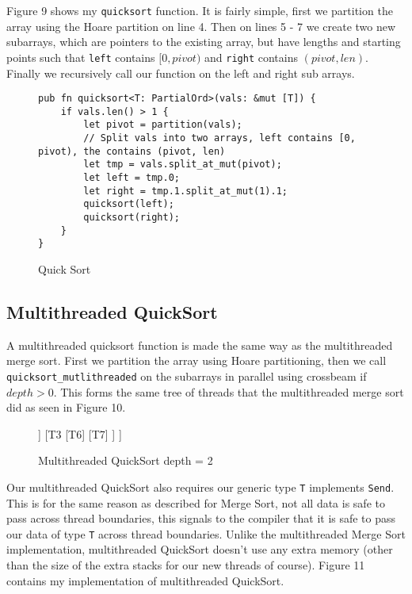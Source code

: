 \documentclass[12pt,letterpaper]{report}
\newcommand{\rust}[1]{\texttt{#1}}
\begin{document}
	Figure 9 shows my \rust{quicksort} function. It is fairly simple, first we partition the array using the Hoare partition on line 4. Then on lines 5 - 7 we create two new subarrays, which are pointers to the existing array, but have lengths and starting points such that \rust{left} contains $[0, pivot)$ and \rust{right} contains $(pivot, len)$. Finally we recursively call our function on the left and right sub arrays.

	\begin{figure}[H]
    \begin{verbatim}
pub fn quicksort<T: PartialOrd>(vals: &mut [T]) {
    if vals.len() > 1 {
        let pivot = partition(vals);
        // Split vals into two arrays, left contains [0, pivot), the contains (pivot, len)
        let tmp = vals.split_at_mut(pivot);
        let left = tmp.0;
        let right = tmp.1.split_at_mut(1).1;
        quicksort(left);
        quicksort(right);
    }
}
    \end{verbatim}
    \caption{Quick Sort}
\end{figure}
	
	\subsection*{Multithreaded QuickSort}
	
	A multithreaded quicksort function is made the same way as the multithreaded merge sort. First we partition the array using Hoare partitioning, then we call \rust{quicksort_mutlithreaded} on the subarrays in parallel using crossbeam if $depth > 0$. This forms the same tree of threads that the multithreaded merge sort did as seen in Figure 10.
	
\begin{figure}[H]	
	\begin{center}
	\begin{forest}
	[T1
		[T2
			[T4]
			[T5]
		]
		[T3
			[T6]
			[T7]
		]
	]
	\end{forest}
    \caption{Multithreaded QuickSort depth = 2}
    \end{center}
\end{figure}

	Our multithreaded QuickSort also requires our generic type \rust{T} implements \rust{Send}. This is for the same reason as described for Merge Sort, not all data is safe to pass across thread boundaries, this signals to the compiler that it is safe to pass our data of type \rust{T} across thread boundaries. Unlike the multithreaded Merge Sort implementation, multithreaded QuickSort doesn't use any extra memory (other than the size of the extra stacks for our new threads of course). Figure 11 contains my implementation of multithreaded QuickSort.
	
\end{document}
